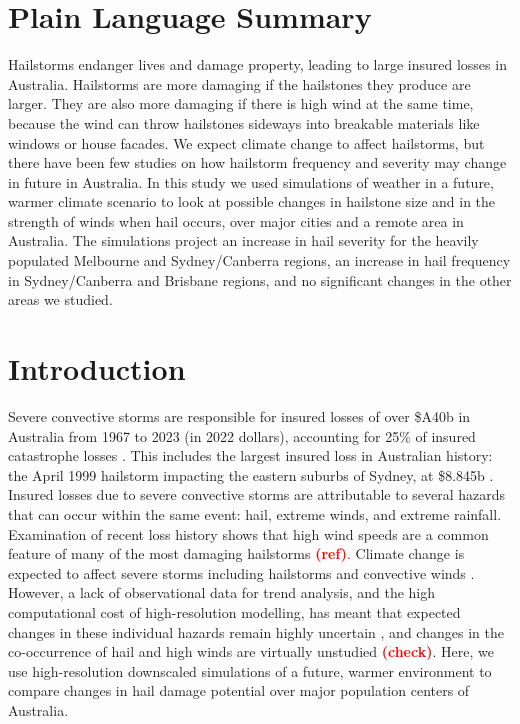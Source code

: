 \documentclass[]{agujournal2019}\usepackage[]{graphicx}\usepackage[]{xcolor}
\newcommand*{\todo}[1]{\textbf{\textcolor{red}{(#1)}}}
\newcommand*{\mref}{\todo{ref}}
\begin{document}
\section*{Plain Language Summary}

Hailstorms endanger lives and damage property, leading to large insured losses in Australia. Hailstorms are more damaging if the hailstones they produce are larger. They are also more damaging if there is high wind at the same time, because the wind can throw hailstones sideways into breakable materials like windows or house facades. We expect climate change to affect hailstorms, but there have been few studies on how hailstorm frequency and severity may change in future in Australia. In this study we used simulations of weather in a future, warmer climate scenario to look at possible changes in hailstone size and in the strength of winds when hail occurs, over major cities and a remote area in Australia. The simulations project an increase in hail severity for the heavily populated Melbourne and Sydney/Canberra regions, an increase in hail frequency in Sydney/Canberra and Brisbane regions, and no significant changes in the other areas we studied.

\section{Introduction}

Severe convective storms are responsible for insured losses of over \$A40b in Australia from 1967 to 2023 (in 2022 dollars), accounting for 25\% of insured catastrophe losses \cite{ICA_2024}. This includes the largest insured loss in Australian history: the April 1999 hailstorm impacting the eastern suburbs of Sydney, at \$8.845b \cite<normalized to 2022 dollars, >{ICA_2024}. Insured losses due to severe convective storms are attributable to several hazards that can occur within the same event: hail, extreme winds, and extreme rainfall. Examination of recent loss history shows that high wind speeds are a common feature of many of the most damaging hailstorms \mref{}. Climate change is expected to affect severe storms \cite{Allen_2018} including hailstorms \cite{Raupach_NREE_2021} and convective winds \cite{Brown_JGRA_2021}. However, a lack of observational data for trend analysis, and the high computational cost of high-resolution modelling, has meant that expected changes in these individual hazards remain highly uncertain \cite{Raupach_NREE_2021,Brown_JGRA_2021}, and changes in the co-occurrence of hail and high winds are virtually unstudied \todo{check}. Here, we use high-resolution downscaled simulations of a future, warmer environment to compare changes in hail damage potential over major population centers of Australia.
\end{document}
